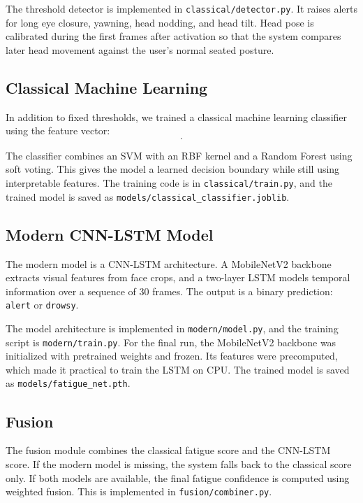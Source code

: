 \documentclass[conference]{IEEEtran}
\begin{document}
The threshold detector is implemented in \texttt{classical/detector.py}. It raises alerts for long eye closure, yawning, head nodding, and head tilt. Head pose is calibrated during the first frames after activation so that the system compares later head movement against the user's normal seated posture.

\subsection{Classical Machine Learning}

In addition to fixed thresholds, we trained a classical machine learning classifier using the feature vector:
\begin{equation*}
[\text{EAR}, \text{MAR}, \text{pitch}, \text{yaw}, \text{roll}, \text{blink rate}].
\end{equation*}

The classifier combines an SVM with an RBF kernel and a Random Forest using soft voting. This gives the model a learned decision boundary while still using interpretable features. The training code is in \texttt{classical/train.py}, and the trained model is saved as \texttt{models/classical\_classifier.joblib}.

\subsection{Modern CNN-LSTM Model}

The modern model is a CNN-LSTM architecture. A MobileNetV2 backbone \cite{mobilenetv2} extracts visual features from face crops, and a two-layer LSTM models temporal information over a sequence of 30 frames. The output is a binary prediction: \texttt{alert} or \texttt{drowsy}.

The model architecture is implemented in \texttt{modern/model.py}, and the training script is \texttt{modern/train.py}. For the final run, the MobileNetV2 backbone was initialized with pretrained weights and frozen. Its features were precomputed, which made it practical to train the LSTM on CPU. The trained model is saved as \texttt{models/fatigue\_net.pth}.

\subsection{Fusion}

The fusion module combines the classical fatigue score and the CNN-LSTM score. If the modern model is missing, the system falls back to the classical score only. If both models are available, the final fatigue confidence is computed using weighted fusion. This is implemented in \texttt{fusion/combiner.py}.
\end{document}
